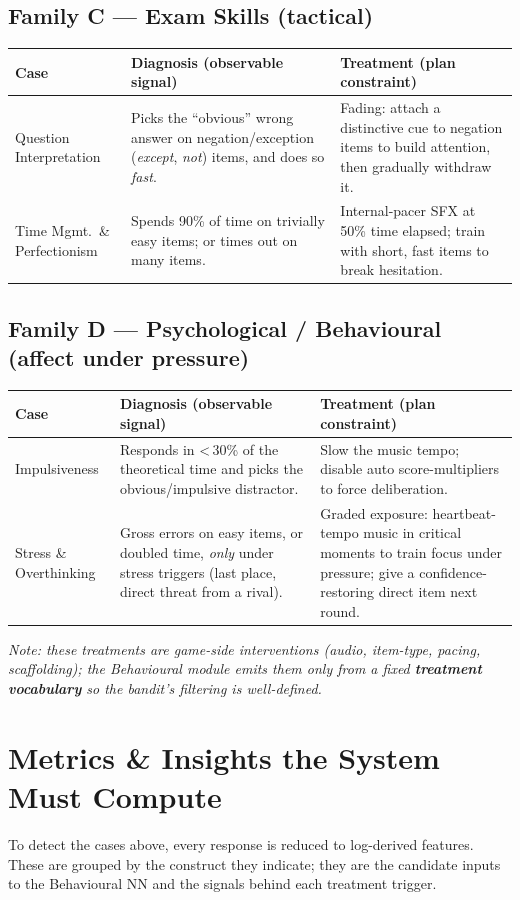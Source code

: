 \documentclass[11pt]{article}
\begin{document}
\subsection{Family C --- Exam Skills (tactical)}
\begin{tabularx}{\textwidth}{@{}p{3.6cm}YY@{}}
\toprule
\textbf{Case} & \textbf{Diagnosis (observable signal)} & \textbf{Treatment (plan constraint)}\\
\midrule
Question Interpretation & Picks the ``obvious'' wrong answer on negation/exception (\emph{except}, \emph{not}) items, and does so \emph{fast}. & Fading: attach a distinctive cue to negation items to build attention, then gradually withdraw it.\\
Time Mgmt.\ \& Perfectionism & Spends 90\% of time on trivially easy items; or times out on many items. & Internal-pacer SFX at 50\% time elapsed; train with short, fast items to break hesitation.\\
\bottomrule
\end{tabularx}

\subsection{Family D --- Psychological / Behavioural (affect under pressure)}
\begin{tabularx}{\textwidth}{@{}p{3.6cm}YY@{}}
\toprule
\textbf{Case} & \textbf{Diagnosis (observable signal)} & \textbf{Treatment (plan constraint)}\\
\midrule
Impulsiveness & Responds in \textless\,30\% of the theoretical time and picks the obvious/impulsive distractor. & Slow the music tempo; disable auto score-multipliers to force deliberation.\\
Stress \& Overthinking & Gross errors on easy items, or doubled time, \emph{only} under stress triggers (last place, direct threat from a rival). & Graded exposure: heartbeat-tempo music in critical moments to train focus under pressure; give a confidence-restoring direct item next round.\\
\bottomrule
\end{tabularx}

\medskip
\noindent\textit{Note: these treatments are game-side interventions (audio, item-type, pacing, scaffolding); the Behavioural module emits them only from a fixed \textbf{treatment vocabulary} so the bandit's filtering is well-defined.}

\section{Metrics \& Insights the System Must Compute}\label{sec:metrics}
To detect the cases above, every response is reduced to log-derived features. These are grouped by the construct they indicate; they are the candidate inputs to the Behavioural NN and the signals behind each treatment trigger.
\end{document}
